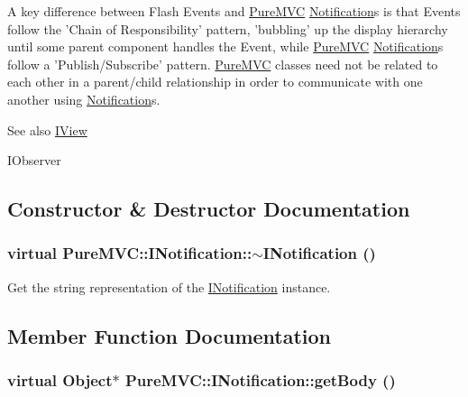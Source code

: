 A key difference between Flash {\ttfamily Event}s and \hyperlink{namespace_pure_m_v_c}{PureMVC} {\ttfamily \hyperlink{class_pure_m_v_c_1_1_notification}{Notification}}s is that {\ttfamily Event}s follow the 'Chain of Responsibility' pattern, 'bubbling' up the display hierarchy until some parent component handles the {\ttfamily Event}, while \hyperlink{namespace_pure_m_v_c}{PureMVC} {\ttfamily \hyperlink{class_pure_m_v_c_1_1_notification}{Notification}}s follow a 'Publish/Subscribe' pattern. \hyperlink{namespace_pure_m_v_c}{PureMVC} classes need not be related to each other in a parent/child relationship in order to communicate with one another using {\ttfamily \hyperlink{class_pure_m_v_c_1_1_notification}{Notification}}s.

\begin{DoxySeeAlso}{See also}
\hyperlink{class_pure_m_v_c_1_1_i_view}{IView} 

IObserver 
\end{DoxySeeAlso}


\subsection{Constructor \& Destructor Documentation}
\hypertarget{class_pure_m_v_c_1_1_i_notification_ac0b60e01d714dc0f765cedd530631173}{
\subsubsection[{$\sim$INotification}]{\setlength{\rightskip}{0pt plus 5cm}virtual PureMVC::INotification::$\sim$INotification ()}}
\label{class_pure_m_v_c_1_1_i_notification_ac0b60e01d714dc0f765cedd530631173}


Get the string representation of the {\ttfamily \hyperlink{class_pure_m_v_c_1_1_i_notification}{INotification}} instance. 

\subsection{Member Function Documentation}
\hypertarget{class_pure_m_v_c_1_1_i_notification_a175f91568692855cdeb2642156d34e05}{
\subsubsection[{getBody}]{\setlength{\rightskip}{0pt plus 5cm}virtual {\bf Object}$\ast$ PureMVC::INotification::getBody ()}}
\label{class_pure_m_v_c_1_1_i_notification_a175f91568692855cdeb2642156d34e05}


